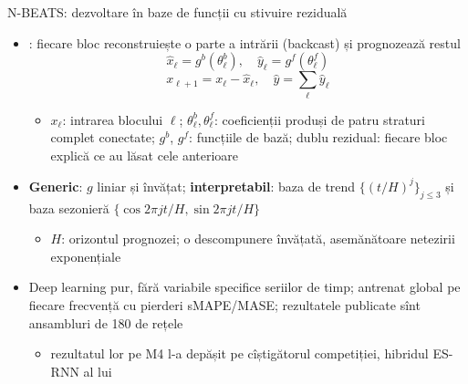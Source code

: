 \begin{frame}{N-BEATS: dezvoltare în baze de funcții cu stivuire reziduală}
\itemsize{\small}
\begin{itemize}
    \item {}: fiecare bloc reconstruiește o parte a intrării (backcast) și prognozează restul
    \[ \hat x_\ell = g^b(\theta^b_\ell), \quad \hat y_\ell = g^f(\theta^f_\ell) \]
    \[ x_{\ell+1} = x_\ell - \hat x_\ell, \quad \hat y = \sum_\ell\hat y_\ell \]
    \begin{itemize}
        \item $x_\ell$: intrarea blocului $\ell$; $\theta^b_\ell, \theta^f_\ell$: coeficienții produși de patru straturi complet conectate; $g^b$, $g^f$: funcțiile de bază; dublu rezidual: fiecare bloc explică ce au lăsat cele anterioare
    \end{itemize}
    \item \textbf{Generic}: $g$ liniar și învățat; \textbf{interpretabil}: baza de trend $\{(t/H)^j\}_{j\le3}$ și baza sezonieră $\{\cos 2\pi jt/H, \sin 2\pi jt/H\}$
    \begin{itemize}
        \item $H$: orizontul prognozei; o descompunere învățată, asemănătoare netezirii exponențiale
    \end{itemize}
    \item Deep learning pur, fără variabile specifice seriilor de timp; antrenat global pe fiecare frecvență cu pierderi sMAPE/MASE; rezultatele publicate sînt ansambluri de 180 de rețele
    \begin{itemize}
        \item rezultatul lor pe M4 l-a depășit pe cîștigătorul competiției, hibridul ES-RNN al lui 
    \end{itemize}
\end{itemize}
\end{frame}

